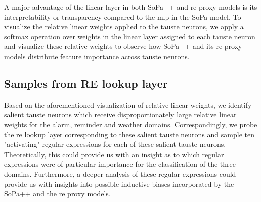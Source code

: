 A major advantage of the linear layer in both SoPa++ and \ac{re} proxy models is its
interpretability or transparency compared to the \ac{mlp} in the SoPa model. To
visualize the relative linear weights applied to the \ac{tauste} neurons, we apply a
softmax operation over weights in the linear layer assigned to each \ac{tauste}
neuron and visualize these relative weights to observe how SoPa++ and its \ac{re}
proxy models distribute feature importance across \ac{tauste} neurons.

\subsection{Samples from RE lookup layer}

Based on the aforementioned visualization of relative linear weights, we
identify salient \ac{tauste} neurons which receive disproportionately large relative
linear weights for the alarm, reminder and weather domains. Correspondingly,
we probe the \ac{re} lookup layer corresponding to these salient \ac{tauste} neurons and
sample ten "activating" regular expressions for each of these salient \ac{tauste}
neurons. Theoretically, this could provide us with an insight as to which
regular expressions were of particular importance for the classification of the
three domains. Furthermore, a deeper analysis of these regular expressions
could provide us with insights into possible inductive biases incorporated by the
SoPa++ and the \ac{re} proxy models.

